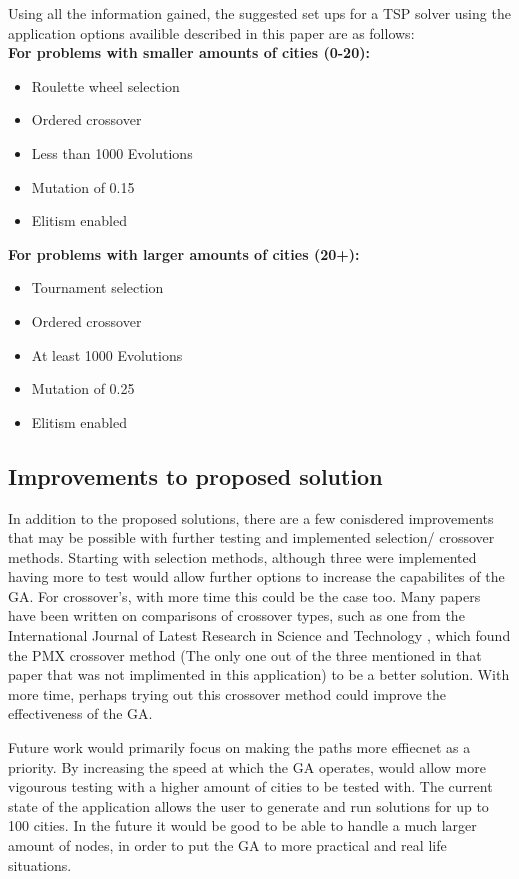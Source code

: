 \documentclass[article]{IEEEtran}
\begin{document}
Using all the information gained, the suggested set ups for a TSP solver using the application options availible described in this paper are as follows:\\
\phantom{.}
\textbf{For problems with smaller amounts of cities (0-20):}
\begin{itemize}
\item Roulette wheel selection
\item Ordered crossover
\item Less than 1000 Evolutions
\item Mutation of 0.15
\item Elitism enabled
\end{itemize} 
\phantom{.}
\textbf{For problems with larger amounts of cities (20+):}
\begin{itemize}
\item Tournament selection
\item Ordered crossover
\item At least 1000 Evolutions
\item Mutation of 0.25
\item Elitism enabled
\end{itemize} 

\subsection{Improvements to proposed solution}
In addition to the proposed solutions, there are a few conisdered improvements that may be possible with further testing and implemented selection/ crossover methods. Starting with selection methods, although three were implemented having more to test would allow further options to increase the capabilites of the GA. For crossover's, with more time this could be the case too. Many papers have been written on comparisons of crossover types, such as one from the International Journal of Latest Research in Science and Technology \cite{14}, which found the PMX crossover method (The only one out of the three mentioned in that paper that was not implimented in this application) to be a better solution. With more time, perhaps trying out this crossover method could improve the effectiveness of the GA.\par
Future work would primarily focus on making the paths more effiecnet as a priority. By increasing the speed at which the GA operates, would allow more vigourous testing with a higher amount of cities to be tested with. The current state of the application allows the user to generate and run solutions for up to 100 cities. In the future it would be good to be able to handle a much larger amount of nodes, in order to put the GA to more practical and real life situations. \\
\end{document}
